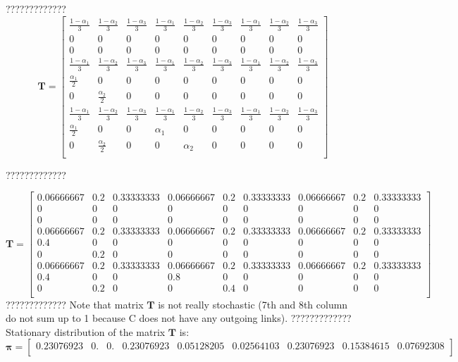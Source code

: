 \documentclass{article}
\begin{document}
?????????????
\[\mathbf{T}=
\begin{bmatrix}
    \frac{1-\alpha_1}{3} &  \frac{1-\alpha_2}{3} & \frac{1-\alpha_3}{3} & \frac{1-\alpha_1}{3} &  \frac{1-\alpha_2}{3} & \frac{1-\alpha_3}{3} & \frac{1-\alpha_1}{3} &  \frac{1-\alpha_2}{3} & \frac{1-\alpha_3}{3} \\
    0 & 0 & 0 &  0 & 0 & 0 & 0 & 0 & 0 \\
    0 & 0 & 0 & 0 & 0 & 0 & 0 & 0 & 0 \\
        \frac{1-\alpha_1}{3} &  \frac{1-\alpha_2}{3} & \frac{1-\alpha_3}{3} & \frac{1-\alpha_1}{3} &  \frac{1-\alpha_2}{3} & \frac{1-\alpha_3}{3} & \frac{1-\alpha_1}{3} &  \frac{1-\alpha_2}{3} & \frac{1-\alpha_3}{3} \\
	    \frac{\alpha_1}{2} & 0 & 0 & 0 & 0 & 0 & 0 & 0 & 0 \\
	   0 & \frac{\alpha_2}{2} & 0 & 0 & 0 & 0 & 0 & 0 & 0 \\
        \frac{1-\alpha_1}{3} &  \frac{1-\alpha_2}{3} & \frac{1-\alpha_3}{3} & \frac{1-\alpha_1}{3} &  \frac{1-\alpha_2}{3} & \frac{1-\alpha_3}{3} & \frac{1-\alpha_1}{3} &  \frac{1-\alpha_2}{3} & \frac{1-\alpha_3}{3} \\
		   \frac{\alpha_1}{2} & 0 & 0 & \alpha_1 & 0 & 0 & 0 & 0 & 0 \\
		  0 & \frac{\alpha_2}{2} & 0 & 0 & \alpha_2 & 0 & 0 & 0 & 0 \\

\end{bmatrix}
\]

?????????????

\[\mathbf{T}=
\begin{bmatrix}
    0.06666667 & 0.2 & 0.33333333 &  0.06666667 &  0.2 & 0.33333333 & 0.06666667 & 0.2 & 0.33333333 \\
    0 & 0 & 0 & 0 & 0 & 0 & 0 & 0 & 0 \\
    0 & 0 & 0 & 0 & 0 & 0 & 0 & 0 & 0 \\
       0.06666667 & 0.2 & 0.33333333 &  0.06666667 &  0.2 & 0.33333333 & 0.06666667 & 0.2 & 0.33333333 \\
	   0.4 & 0 & 0 & 0 & 0 & 0 & 0 & 0 & 0 \\
	   0 & 0.2 & 0 & 0 & 0 & 0 & 0 & 0 & 0 \\
       0.06666667 & 0.2 & 0.33333333 &  0.06666667 &  0.2 & 0.33333333 & 0.06666667 & 0.2 & 0.33333333 \\
		  0.4 & 0 & 0 & 0.8 & 0 & 0 & 0 & 0 & 0 \\
		  0 & 0.2 & 0 & 0 &0.4 & 0 & 0 & 0 & 0 \\

\end{bmatrix}
\]
?????????????
Note that matrix $\mathbf{T}$ is not really stochastic (7th and 8th column do not sum up to 1 because  C does not have any outgoing links).
?????????????
Stationary distribution of the matrix $\mathbf{T}$ is:
\[\mathbf{\pi} = \begin{bmatrix}
	0.23076923 & 0. &  0. & 0.23076923 &  0.05128205 &  0.02564103 &  0.23076923 & 0.15384615 & 0.07692308\\
	\end{bmatrix}
\]
\end{document}
